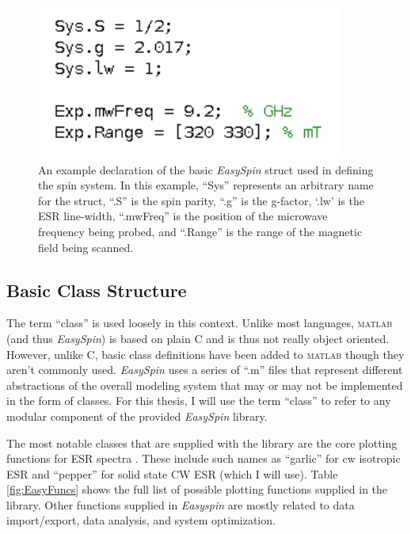 \documentclass[oneside, noacknowlegments]{BYUPhys}
\begin{document}
\begin{figure}
    \centerline{\includegraphics{example_params_fig}}
    \caption[Simple Spin System Definition]{\label{fig:SpinDefinition}
     An example declaration of the basic \textit{EasySpin} struct used in defining the spin system. In this example, ``Sys'' represents an arbitrary name for the struct, ``.S'' is the spin parity, ``.g'' is the g-factor, `.lw' is the ESR line-width, ``.mwFreq'' is the position of the microwave frequency being probed, and ``.Range'' is the range of the magnetic field being scanned.}
 \end{figure}

\subsection{Basic Class Structure}

The term ``class'' is used loosely in this context. Unlike most languages, \textsc{matlab} (and thus \textit{EasySpin}) is based on plain C and is thus not really object oriented. However, unlike C, basic class definitions have been added to \textsc{matlab} though they aren't commonly used. \textit{EasySpin} uses a series of ``.m'' files that represent different abstractions of the overall modeling system that may or may not be implemented in the form of classes. For this thesis, I will use the term ``class'' to refer to any modular component of the provided \textit{EasySpin} library.

The most notable classes that are supplied with the library are the core plotting functions for ESR spectra \cite{RefWorks:doc:589299f4e4b0d4c09201f915}. These include such names as ``garlic'' for cw isotropic ESR and ``pepper'' for solid state CW ESR (which I will use). Table \ref{fig:EasyFuncs} shows the full list of possible plotting functions supplied in the library. Other functions supplied in \textit{Easyspin} are mostly related to data import/export, data analysis, and system optimization.
\end{document}
